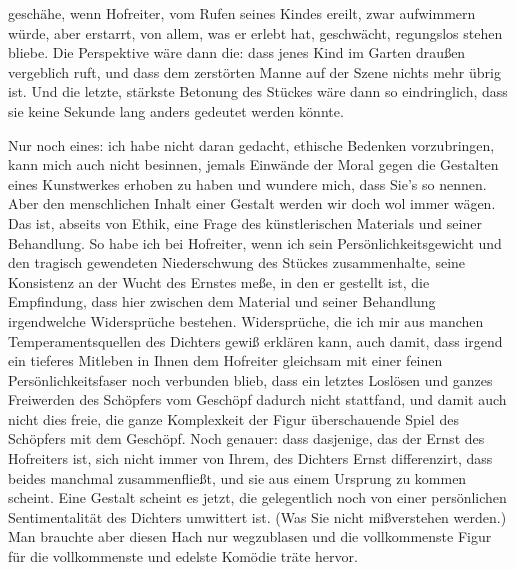                geschähe, wenn Hofreiter, vom
               Rufen seines Kindes ereilt, zwar aufwimmern würde, aber erstarrt, von allem, was er
               erlebt hat, geschwächt, regungslos stehen bliebe. Die Perspektive wäre dann die: dass
               jenes Kind im Garten draußen vergeblich ruft, und dass dem zerstörten Manne auf der
               Szene nichts mehr übrig ist. Und die letzte, stärkste Betonung des Stückes wäre dann so eindringlich, dass sie
               keine Sekunde lang anders gedeutet werden könnte.\pend
           
\pstart
           Nur noch eines: ich habe nicht daran gedacht, ethische Bedenken vorzubringen, kann
               mich auch nicht besinnen, jemals Einwände der Moral gegen die Gestalten eines
               Kunstwerkes erhoben zu haben und wundere mich, dass Sie’s so nennen. Aber den
               menschlichen Inhalt einer Gestalt werden wir doch wol immer wägen. Das ist, abseits
               von Ethik, eine Frage des künstlerischen Materials und seiner Behandlung. So habe ich
               bei Hofreiter, wenn ich sein
               Persönlichkeitsgewicht und den tragisch gewendeten Niederschwung des Stückes zusammenhalte, seine Konsistenz an
               der Wucht des Ernstes meße, in den er gestellt ist, die {\pb}Empfindung, dass hier zwischen
               dem Material und seiner Behandlung irgendwelche Widersprüche bestehen. Widersprüche,
               die ich mir aus manchen Temperamentsquellen des Dichters gewiß erklären kann, auch
               damit, dass irgend ein tieferes Mitleben in Ihnen dem Hofreiter gleichsam mit einer feinen Persönlichkeitsfaser
               noch verbunden blieb, dass ein letztes Loslösen und ganzes Freiwerden des Schöpfers
               vom Geschöpf dadurch nicht stattfand, und damit auch nicht dies freie, die ganze
               Komplexkeit der Figur überschauende Spiel des Schöpfers mit dem Geschöpf. Noch
               genauer: dass dasjenige, das der Ernst des Hofreiters ist, sich nicht immer von Ihrem, des Dichters
               Ernst differenzirt, dass beides manchmal zusammenfließt, und sie aus einem Ursprung
               zu kommen scheint. Eine Gestalt scheint es jetzt, die gelegentlich noch von einer
               persönlichen Sentimentalität des Dichters umwittert ist. (Was Sie nicht mißverstehen
               werden.) Man brauchte aber diesen Hach nur wegzublasen und die vollkommenste Figur
               für die vollkommenste und edelste Komödie träte hervor.\pend
           
